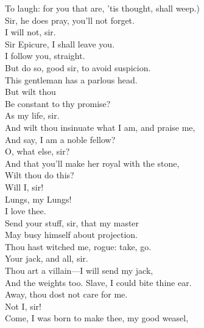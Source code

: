\documentclass[a4paper,oneside,12pt]{memoir}
\begin{document}
\begin{drama*}
To laugh: for you that are, 'tis thought, shall weep.)\\
\facespeaks Sir, he does pray, you'll not forget.\\
\surlyspeaks {} I will not, sir.\\
Sir Epicure, I shall leave you.\\
\mammonspeaks {} I follow you, straight.\\
\facespeaks But do so, good sir, to avoid suspicion.\\
This gentleman has a parlous head.\\
\mammonspeaks {} But wilt thou\\
Be constant to thy promise?\\
\facespeaks {} As my life, sir.\\
\mammonspeaks And wilt thou insinuate what I am, and praise me,\\
And say, I am a noble fellow?\\
\facespeaks {} O, what else, sir?\\
And that you'll make her royal with the stone,\\
\mammonspeaks Wilt thou do this?\\
\facespeaks {} Will I, sir!\\
\mammonspeaks {} Lungs, my Lungs!\\
I love thee.\\
\facespeaks {} Send your stuff, sir, that my master\\
May busy himself about projection.\\
\mammonspeaks Thou hast witched me, rogue: take, go.\\
\facespeaks {} Your jack, and all, sir.\\
\mammonspeaks Thou art a villain---I will send my jack,\\
And the weights too. Slave, I could bite thine ear.\\
Away, thou dost not care for me.\\
\facespeaks {} Not I, sir!\\
\mammonspeaks Come, I was born to make thee, my good weasel,\\

\end{drama*}
\end{document}
